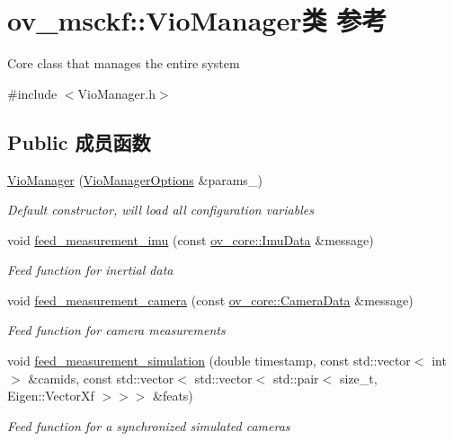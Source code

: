 \hypertarget{classov__msckf_1_1VioManager}{}\section{ov\+\_\+msckf\+:\+:Vio\+Manager类 参考}
\label{classov__msckf_1_1VioManager}


Core class that manages the entire system  




{\ttfamily \#include $<$Vio\+Manager.\+h$>$}

\subsection*{Public 成员函数}
\begin{DoxyCompactItemize}
\item 
\hyperlink{classov__msckf_1_1VioManager_aa2376a11794739f8d7811d6e7c0dd447}{Vio\+Manager} (\hyperlink{structov__msckf_1_1VioManagerOptions}{Vio\+Manager\+Options} \&params\+\_\+)
\begin{DoxyCompactList}\small\item\em Default constructor, will load all configuration variables \end{DoxyCompactList}\item 
void \hyperlink{classov__msckf_1_1VioManager_a5e7dde1c28eb800c663fb2e238cc60ea}{feed\+\_\+measurement\+\_\+imu} (const \hyperlink{structov__core_1_1ImuData}{ov\+\_\+core\+::\+Imu\+Data} \&message)
\begin{DoxyCompactList}\small\item\em Feed function for inertial data \end{DoxyCompactList}\item 
void \hyperlink{classov__msckf_1_1VioManager_a96cd1d24579772a7e1f6c6ff068dc489}{feed\+\_\+measurement\+\_\+camera} (const \hyperlink{structov__core_1_1CameraData}{ov\+\_\+core\+::\+Camera\+Data} \&message)
\begin{DoxyCompactList}\small\item\em Feed function for camera measurements \end{DoxyCompactList}\item 
void \hyperlink{classov__msckf_1_1VioManager_a12eedc237bb96866b368dc87d7f53aa5}{feed\+\_\+measurement\+\_\+simulation} (double timestamp, const std\+::vector$<$ int $>$ \&camids, const std\+::vector$<$ std\+::vector$<$ std\+::pair$<$ size\+\_\+t, Eigen\+::\+Vector\+Xf $>$$>$$>$ \&feats)
\begin{DoxyCompactList}\small\item\em Feed function for a synchronized simulated cameras \end{DoxyCompactList}\item 

\end{DoxyCompactItemize}
